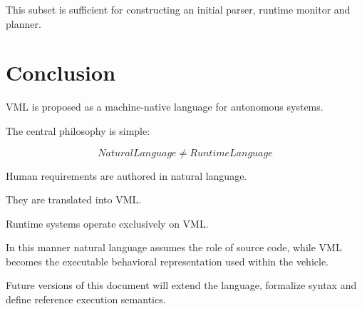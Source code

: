 \documentclass[11pt,a4paper]{article}
\begin{document}
This subset is sufficient for constructing an initial parser,
runtime monitor and planner.

\section{Conclusion}

VML is proposed as a machine-native language for autonomous systems.

The central philosophy is simple:

\[
NaturalLanguage
\neq
RuntimeLanguage
\]

Human requirements are authored in natural language.

They are translated into VML.

Runtime systems operate exclusively on VML.

In this manner natural language assumes the role of source code,
while VML becomes the executable behavioral representation used within
the vehicle.

Future versions of this document will extend the language,
formalize syntax and define reference execution semantics.
\end{document}
